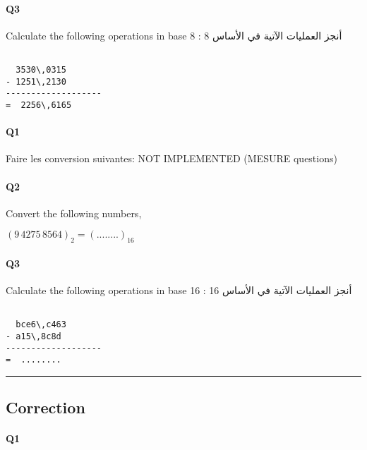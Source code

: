 \paragraph{Q3}

Calculate  the following operations in base 8 :  أنجز العمليات الآتية في الأساس 8

\begin{verbatim}

  3530\,0315
- 1251\,2130
-------------------
=  2256\,6165

\end{verbatim}
\pagebreak

\paragraph{Q1}

Faire les conversion suivantes: NOT IMPLEMENTED (MESURE questions) 

\paragraph{Q2}






Convert the following numbers, \hfill{}

$(9\,4275\,8564)_{ 2 } = (........)_{ 16}$



\paragraph{Q3}

Calculate  the following operations in base 16 :  أنجز العمليات الآتية في الأساس 16

\begin{verbatim}

  bce6\,c463
- a15\,8c8d
-------------------
=  ........

\end{verbatim}


\hrule width 1\linewidth
\pagebreak

\subsection{Correction}


\paragraph{Q1}

